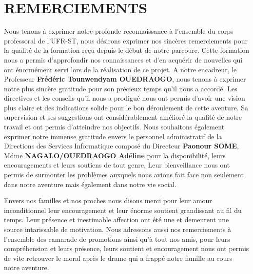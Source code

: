 \chapter*{REMERCIEMENTS}
\thispagestyle{MyStyle}

Nous tenons à exprimer notre profonde reconnaissance à l’ensemble du corps professoral de l'UFR-ST, nous désirons exprimer nos sincères remerciements pour la qualité de la formation reçu depuis le début de notre parcoure. Cette formation nous a permis d’approfondir nos connaissances et d’en acquérir de nouvelles qui ont énormément servi lors de la réalisation de ce projet.
    A notre encadreur, le Professeur \textbf{Frédéric Tounwendyam OUEDRAOGO}, nous tenons à exprimer notre plus sincère gratitude pour son précieux temps qu'il nous a accordé. Les directives et les conseils qu'il nous a prodigué nous ont permis d'avoir une vision plus claire et des indications solide pour le bon déroulement de cette aventure. Sa supervision et ses suggestions ont considérablement amélioré la qualité de notre travail et ont permis d’atteindre nos objectifs.  Nous souhaitons également exprimer notre immense gratitude envers le personnel administratif de la Directions des Services Informatique composé du  Directeur \textbf{Paonour SOME}, Mdme \textbf{NAGALO/OUEDRAOGO Adéline} pour la disponibilité, leurs encouragements et leurs soutiens de tout genre, Leur bienveillance nous ont permis de surmonter les problèmes auxquels nous avions fait face non seulement dans notre aventure mais également dans notre vie social.
    
 Envers nos familles et nos proches nous disons merci pour leur amour inconditionnel leur encouragement et leur énorme soutient grandissant au fil du temps. Leur présence et inestimable affection ont été une et demeurent une source intarissable de motivation.
Nous adressons aussi nos remerciements à l'ensemble des camarade de promotions ainsi qu'à tout nos amis, pour leurs compréhension et leurs présence, leurs soutient et encouragement nous ont permis de vite retrouver le moral après le drame qui a frappé notre famille au cours notre aventure. 
\par